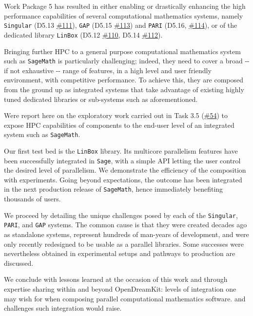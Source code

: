 Work Package 5 has resulted in either enabling or drastically enhancing
the high performance capabilities of several computational mathematics
systems, namely \texttt{Singular} (D5.13
\href{https://github.com/OpenDreamKit/OpenDreamKit/issues/111}{\#111}),
\texttt{GAP} (D5.15
\href{https://github.com/OpenDreamKit/OpenDreamKit/issues/113}{\#113})
and \texttt{PARI} (D5.16,
\href{https://github.com/OpenDreamKit/OpenDreamKit/issues/114}{\#114}),
or of the dedicated library \texttt{LinBox} (D5.12
\href{https://github.com/OpenDreamKit/OpenDreamKit/issues/110}{\#110},
D5.14
\href{https://github.com/OpenDreamKit/OpenDreamKit/issues/112}{\#112}).

Bringing further HPC to a general purpose computational mathematics
system such as \texttt{SageMath} is particularly challenging; indeed,
they need to cover a broad -\/- if not exhaustive -\/- range of
features, in a high level and user friendly environment, with
competitive performance. To achieve this, they are composed from the
ground up as integrated systems that take advantage of existing highly
tuned dedicated libraries or sub-systems such as aforementioned.

Were report here on the exploratory work carried out in Task 3.5
(\href{https://github.com/OpenDreamKit/OpenDreamKit/issues/54}{\#54}) to
expose HPC capabilities of components to the end-user level of an
integrated system such as \texttt{SageMath}.

Our first test bed is the \texttt{LinBox} library. Its multicore
parallelism features have been successfully integrated in \texttt{Sage},
with a simple API letting the user control the desired level of
parallelism. We demonstrate the efficiency of the composition with
experiments. Going beyond expectations, the outcome has been integrated
in the next production release of \texttt{SageMath}, hence immediately
benefiting thousands of users.

We proceed by detailing the unique challenges posed by each of the
\texttt{Singular}, \texttt{PARI}, and \texttt{GAP} systems. The common
cause is that they were created decades ago as standalone systems,
represent hundreds of man-years of development, and were only recently
redesigned to be usable as a parallel libraries. Some successes were
nevertheless obtained in experimental setups and pathways to production
are discussed.

We conclude with lessons learned at the occasion of this work and
through expertise sharing within and beyond OpenDreamKit: levels of
integration one may wish for when composing parallel computational
mathematics software. and challenges such integration would raise.
